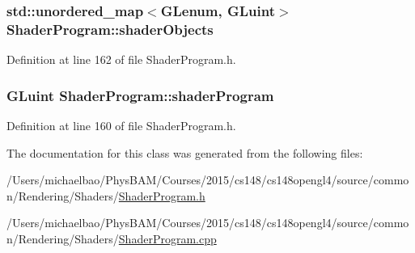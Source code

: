 \subsubsection[{shader\+Objects}]{\setlength{\rightskip}{0pt plus 5cm}std\+::unordered\+\_\+map$<$G\+Lenum, G\+Luint$>$ Shader\+Program\+::shader\+Objects\hspace{0.3cm}{\ttfamily [private]}}\label{class_shader_program_a8eabcc4ff693bc9430daef8cfc6008de}


Definition at line 162 of file Shader\+Program.\+h.

\hypertarget{class_shader_program_a7d8f2b643a81ac4097606e43ade92f81}{}
\subsubsection[{shader\+Program}]{\setlength{\rightskip}{0pt plus 5cm}G\+Luint Shader\+Program\+::shader\+Program\hspace{0.3cm}{\ttfamily [protected]}}\label{class_shader_program_a7d8f2b643a81ac4097606e43ade92f81}


Definition at line 160 of file Shader\+Program.\+h.



The documentation for this class was generated from the following files\+:\begin{DoxyCompactItemize}
\item 
/\+Users/michaelbao/\+Phys\+B\+A\+M/\+Courses/2015/cs148/cs148opengl4/source/common/\+Rendering/\+Shaders/\hyperlink{_shader_program_8h}{Shader\+Program.\+h}\item 
/\+Users/michaelbao/\+Phys\+B\+A\+M/\+Courses/2015/cs148/cs148opengl4/source/common/\+Rendering/\+Shaders/\hyperlink{_shader_program_8cpp}{Shader\+Program.\+cpp}\end{DoxyCompactItemize}
